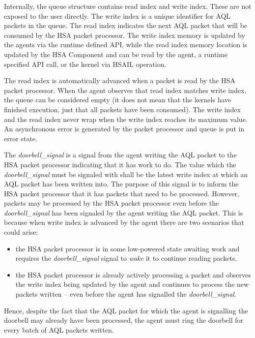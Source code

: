 \documentclass{book}
\newcommand{\reffld}[1]{\textit{#1}}
\begin{document}
 

\vspace{-3mm}Internally, the queue structure contains read index and
write index.  These are not exposed to the user directly.  The write
index is a unique identifier for AQL packets in the queue. The read
index indicates the next AQL packet that will be consumed by the HSA
packet processor. The write index memory is updated by the agents via
the runtime defined API, while the read index memory location is
updated by the HSA Component and can be read by the agent, a runtime
specified API call, or the kernel via HSAIL operation.

The read index is automatically advanced when a packet is read by the
HSA packet processor. When the agent observes that read index matches
write index, the queue can be considered empty (it does not mean that
the kernels have finished execution, just that all packets have been
consumed). The write index and the read index never wrap when the
write index reaches its maximum value. An asynchronous error is
generated by the packet processor and queue is put in error state.

The \reffld{doorbell\_signal} is a signal from the agent writing the
AQL packet to the HSA packet processor indicating that it has work
to do. The value which the \reffld{doorbell\_signal} must be
signaled with shall be the latest write index at
which an AQL packet has been written into.  The purpose of this
signal is to inform the HSA packet processor that it has
packets that need to be processed. However, packets may be processed
by the HSA packet processor even before the
\reffld{doorbell\_signal} has been signaled by the agent writing the
AQL packet.  This is because when write index is advanced by the
agent there are two scenarios that could arise:
\vspace{-2mm}\begin{itemize}
\item the HSA packet processor is in some low-powered state
  awaiting work and requires the
  \reffld{doorbell\_signal} signal to \emph{wake} it
  to continue reading packets.
\item the HSA
  packet processor is already actively processing a
  packet and observes the write index being
  updated by the agent and continues to process the
  new packets written -- even before the agent has
  signalled the \reffld{doorbell\_signal}.
\end{itemize}
Hence, despite the fact that the AQL packet for which the agent is
signalling the doorbell may already have been processed, the agent
must ring the doorbell for every batch of AQL packets written.
\end{document}
